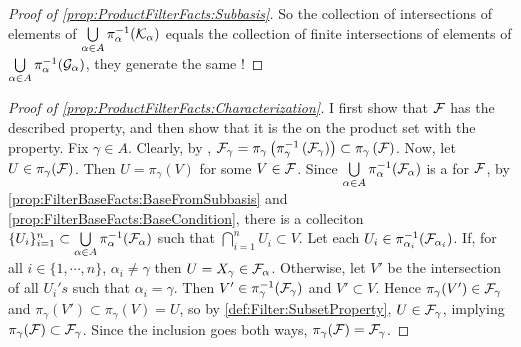 \begin{prop}
\begin{proof}[Proof of \ref{prop:ProductFilterFacts:Subbasis}]
    So the collection of \Finite intersections of elements 
    of $\bigcup\limits_{\alpha \in A} \pi_{\alpha}^{-1}(\mathcal{K}_\alpha)$ equals the 
    collection of finite intersections of elements of $\bigcup\limits_{\alpha \in A} \pi_{\alpha}^{-1}(\mathcal{G}_\alpha)$, they generate the same \Filter!
\end{proof}
\begin{proof}[Proof of \ref{prop:ProductFilterFacts:Characterization}]
I first show that $\mathcal{F}$ has the described property, 
and then show that it is the \CoarsestFilter on the product set with the property. 
Fix $\gamma \in A$. Clearly, by \Surjectivity, $\mathcal{F}_\gamma = \pi_\gamma\left(  \pi_{\gamma}^{-1} \left( \mathcal{F}_\gamma\right)\right) \subset \pi_{\gamma}\left( \mathcal{F}\right)$. 
Now, let $U \in \pi_{\gamma}(\mathcal{F})$. Then $U=\pi_{\gamma}(V)$ for some $V \in \mathcal{F}$. 
Since $\bigcup\limits_{\alpha \in A} \pi_{\alpha}^{-1}(\mathcal{F}_\alpha)$ is a 
\FilterSubbasis for $\mathcal{F}$, by \ref{prop:FilterBaseFacts:BaseFromSubbasis}
and \ref{prop:FilterBaseFacts:BaseCondition}, there is a
colleciton $\{U_i\}_{i=1}^n \subset \bigcup\limits_{\alpha \in A} \pi_{\alpha}^{-1}(\mathcal{F}_\alpha)$
such that $\bigcap\limits_{i=1}^n U_i \subset V$. 
Let each $U_i \in \pi_{\alpha_i}^{-1}(\mathcal{F}_{\alpha_i})$. 
If, for all $i \in \{1,\cdots,n\}$,
$\alpha_i \neq \gamma$  then $U=X_\gamma \in \mathcal{F}_\alpha$. 
Otherwise, let $V'$ be the intersection of all $U_i's$ such that $\alpha_i=\gamma$. 
Then $V' \in \pi_{\gamma}^{-1}(\mathcal{F}_\gamma)$ and $V' \subset V$. 
Hence $\pi_{\gamma}(V') \in \mathcal{F}_\gamma$ and $\pi_{\gamma}(V') \subset \pi_\gamma(V)=U$, 
so by  \ref{def:Filter:SubsetProperty}, $U \in \mathcal{F}_\gamma$, implying
$\pi_\gamma(\mathcal{F}) \subset \mathcal{F}_\gamma$. 
Since the inclusion goes both ways, $\pi_{\gamma}(\mathcal{F}) = \mathcal{F}_\gamma$. 


\end{proof}
\end{prop}
